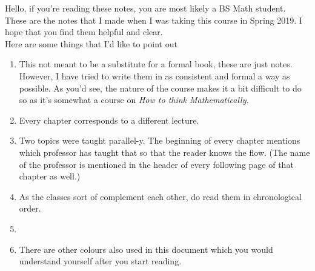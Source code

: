\iffalse Proper introduction to be finalised at the end, main points:
\begin{enumerate}
    \itemsep0em
    \item Not a formal book, supposed to be notes.
    \item Every chapter corresponds to a different lecture.
    \item Two topics were taught parallel-y. The beginning of every chapter mentions which professor has taught that so that the reader knows the flow. (The name of the professor is mentioned in the header of every following page of that chapter as well.)
    \item As the classes sort of complement each other, do read them in chronological order.
    \item {\color{mylinkcolor}{Text written in this shade of blue represents a hyperlink (except for this text itself) and depending on your file viewer, you can click on it to jump to the appropriate section. (Do note your position before clicking on it, though.)}}
    \item There are other colours also used in this document which you would understand yourself after you start reading.
    \item Appreciate the course!
\end{enumerate}
\fi
Hello, if you're reading these notes, you are most likely a BS Math student.\\
These are the notes that I made when I was taking this course in Spring 2019. I hope that you find them helpful and clear.\\
Here are some things that I'd like to point out
\begin{enumerate}[nosep] 
	\item This not meant to be a substitute for a formal book, these are just notes. However, I have tried to write them in as consistent and formal a way as possible. As you'd see, the nature of the course makes it a bit difficult to do so as it's somewhat a course on \emph{How to think Mathematically.}
    \item Every chapter corresponds to a different lecture.
    \item Two topics were taught parallel-y. The beginning of every chapter mentions which professor has taught that so that the reader knows the flow. (The name of the professor is mentioned in the header of every following page of that chapter as well.)
    \item As the classes sort of complement each other, do read them in chronological order.
    \item {\color{mylinkcolor}{Text written in this shade of blue represents a hyperlink (except for this text itself) and depending on your file viewer, you can click on it to jump to the appropriate section. (Do note your position before clicking on it, though.)}}
    \item There are other colours also used in this document which you would understand yourself after you start reading.
\end{enumerate}
